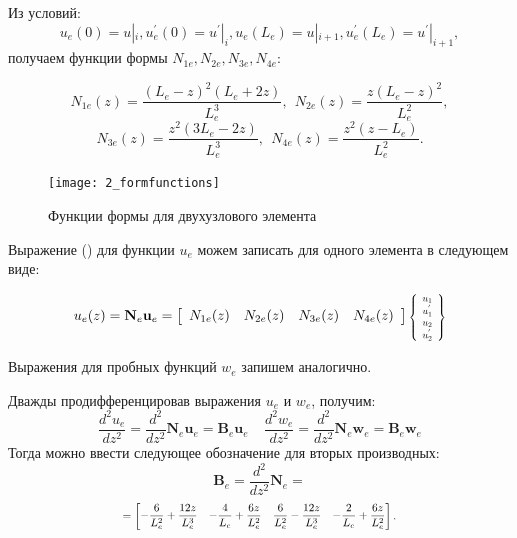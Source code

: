 \documentclass[7pt]{beamer}
\numberwithin{equation}{section}
\newcommand*{\Scale}[2][4]{\scalebox{#1}{$#2$}}
\begin{document}
\begin{frame}{}
	Из условий:
		\[u_e(0)=u|_i, u_e^{'}(0)=u^{'}|_{i}, u_{e}(L_e)=u|_{i+1}, u_{e}^{'}(L_e)=u^{'}|_{i+1},\] 
	получаем функции формы $N_{1e},N_{2e},N_{3e},N_{4e}$:
	\begin{block}{} 
		\begin{equation}
			\label{beam1}
			N_{1e}(z)=\frac{(L_e-z)^2(L_e+2z)}{L_e^3},~~ N_{2e}(z)=\frac{z(L_e-z)^{2}}{L_e^{2}},
		\end{equation}
		\begin{equation}
			\label{beam2}
			N_{3e}(z)=\frac{z^{2}(3L_e-2z)}{L_e^3},~~N_{4e}(z)=\frac{z^2(z-L_e)}{L_e^{2}}.
		\end{equation}
	\end{block}

	\begin{figure}[H]
		\centering
		\texttt{[image: 2\_formfunctions]}
		\caption{Функции формы для двухузлового элемента}
		\label{fig:hermite}
	\end{figure}
\end{frame}
	
\begin{frame}
Выражение () для функции $u_{e}$ можем записать для одного элемента в следующем виде:
	\begin{block}{}
		\[
			u_e(z)=\textbf{N}_e \textbf{u}_{e}=
			\left[
			\begin{array}{cccc}
				N_{1e}(z) & N_{2e}(z) & N_{3e}(z) & N_{4e}(z)
			\end{array}
			\right]
			\Scale[0.7] {
				\left\{
				\begin{array}{ccc}
					u_{1}   \\
					u^{'}_{1}  \\
						u_{2}\\
						u^{'}_{2}\\
				\end{array}
				\right\}
			}
		\]
	\end{block}
	Выражения для пробных функций $w_e$ запишем аналогично.

	Дважды продифференцировав выражения $u_e$ и $w_e$, получим:
		\[
			\frac{d^{2}u_e}{dz^{2}}=\frac{d^{2}}{dz^{2}}\textbf{N}_e \textbf{u}_e=\textbf{B}_e \textbf{u}_e ~~~~~\frac{d^{2}w_e}{dz^{2}}=\frac{d^{2}}{dz^{2}}\textbf{N}_e \textbf{w}_e=\textbf{B}_e \textbf{w}_e
		\]
	Тогда можно ввести следующее обозначение для вторых производных:
	\[\textbf{B}_e=\frac{d^{2}}{dz^{2}}\textbf{N}_e=\]
	\begin{equation*}
		\Scale[0.8] {
			=\begin{bmatrix}
			\displaystyle-\frac{6}{L_e^{2}}+\frac{12z}{L_e^{3}} &  \displaystyle-\frac{4}{L_e}+\frac{6z}{L_e^{2}} &   \displaystyle\frac{6}{L_e^{2}}-\frac{12z}{L_e^{3}} &  \displaystyle-\frac{2}{L_e}+\frac{6z}{L_e^{2}}
			\end{bmatrix}.
		}
	\end{equation*}
\end{frame}
\end{document}
